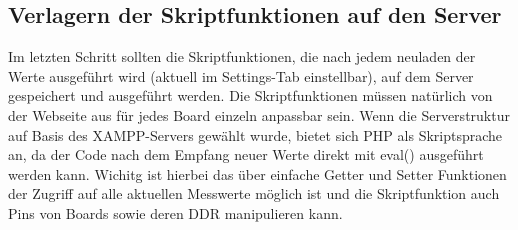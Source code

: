 \subsection{Verlagern der Skriptfunktionen auf den Server}
Im letzten Schritt sollten die Skriptfunktionen, die nach jedem neuladen der
Werte ausgeführt wird (aktuell im Settings-Tab einstellbar), auf dem Server
gespeichert und ausgeführt werden. Die Skriptfunktionen müssen natürlich von der
Webseite aus für jedes Board einzeln anpassbar sein. Wenn die Serverstruktur auf Basis des
XAMPP-Servers gewählt wurde, bietet sich PHP als Skriptsprache an, da der Code
nach dem Empfang neuer Werte direkt mit \textrm{eval()} ausgeführt werden kann.
Wichitg ist hierbei das über einfache Getter und Setter Funktionen der Zugriff
auf alle aktuellen Messwerte möglich ist und die Skriptfunktion auch Pins von
Boards sowie deren DDR manipulieren kann.
